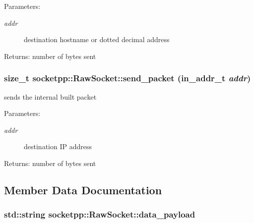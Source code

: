 \begin{Desc}
\item[Parameters:]
\begin{description}
\item[{\em addr}]destination hostname or dotted decimal address \end{description}
\end{Desc}
\begin{Desc}
\item[Returns:]number of bytes sent \end{Desc}
\hypertarget{classsocketpp_1_1RawSocket_5c812c1bf584f40c3fc6263a8014395b}{
\subsubsection[{send\_\-packet}]{\setlength{\rightskip}{0pt plus 5cm}size\_\-t socketpp::RawSocket::send\_\-packet (in\_\-addr\_\-t {\em addr})}}
\label{classsocketpp_1_1RawSocket_5c812c1bf584f40c3fc6263a8014395b}


sends the internal built packet 

\begin{Desc}
\item[Parameters:]
\begin{description}
\item[{\em addr}]destination IP address \end{description}
\end{Desc}
\begin{Desc}
\item[Returns:]number of bytes sent \end{Desc}


\subsection{Member Data Documentation}
\hypertarget{classsocketpp_1_1RawSocket_4d3a1236c4ac42ab029323ae14586ff8}{
\subsubsection[{data\_\-payload}]{\setlength{\rightskip}{0pt plus 5cm}std::string {\bf socketpp::RawSocket::data\_\-payload}}}
\label{classsocketpp_1_1RawSocket_4d3a1236c4ac42ab029323ae14586ff8}


